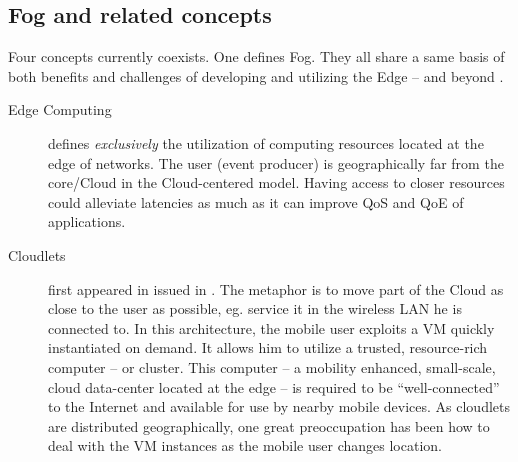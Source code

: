 \documentclass[11pt]{sdm}
\begin{document}
\subsection{Fog and related concepts}

Four concepts currently coexists. One defines Fog. They all share a same basis of both benefits and challenges of developing and utilizing the Edge -- and beyond \cite{george_nanolambda_2020}.

\begin{description}
	\item[Edge Computing] defines \emph{exclusively} the utilization of computing resources located at the edge of networks. The user (event producer) is geographically far from the core/Cloud in the Cloud-centered model. Having access to closer resources could alleviate latencies as much as it can improve \gls{QoS} and \gls{QoE} of applications.
		
	\item[Cloudlets] first appeared in \cite{satyanarayanan_case_2009} issued in . The metaphor is to move part of the Cloud as close to the user as possible, eg. service it in the wireless LAN he is connected to. In this architecture, the mobile user exploits a \gls{VM} quickly instantiated on demand. It allows him to utilize a trusted, resource-rich computer -- or cluster. This computer -- a mobility enhanced, small-scale, cloud data-center located at the edge -- is required to be ``well-connected'' to the Internet and available for use by nearby mobile devices. As cloudlets are distributed geographically, one great preoccupation has been how to deal with the \gls{VM} instances as the mobile user changes location.
	

\end{description}
\end{document}
